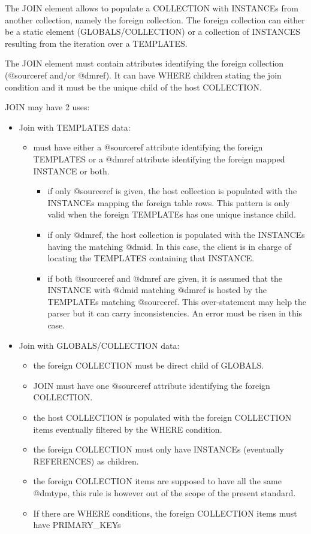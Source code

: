 The JOIN element allows to populate a COLLECTION with INSTANCEs from another collection, namely the foreign collection.
The foreign collection can either be a static element (GLOBALS/COLLECTION) or a collection of INSTANCES resulting from the iteration over a TEMPLATES.

The JOIN element must contain attributes identifying the foreign collection  (@sourceref  and/or @dmref). 
It can have WHERE children stating the join condition and it must be the unique child of the host COLLECTION.

JOIN may have 2 uses:

\begin{itemize}

    \item Join with TEMPLATES data:
       \begin{itemize}
         \item must have either a @sourceref attribute identifying the foreign TEMPLATES or a @dmref attribute identifying the foreign mapped INSTANCE or both.
             \begin{itemize}
               \item if only @sourceref is given, the host collection is populated with the INSTANCEs mapping the foreign table rows. 
                        This pattern is only valid when the foreign TEMPLATEs has  one unique instance child.
               \item if only @dmref, the host collection is populated with the INSTANCEs having the matching @dmid. In this case, 
                        the client is in charge of locating the TEMPLATES containing that INSTANCE.
               \item if both @sourceref and @dmref are given, it is assumed that the INSTANCE with @dmid matching @dmref is hosted by the TEMPLATEs matching @sourceref.
                        This over-statement may help the parser but it can carry inconsistencies. An error must be risen in this case.
             \end{itemize}
    \end{itemize}
  
   \item Join with GLOBALS/COLLECTION data:
       \begin{itemize}
         \item the foreign COLLECTION must be direct child of GLOBALS.
         \item JOIN must have one @sourceref attribute identifying the foreign COLLECTION.
         \item the host COLLECTION is populated with the foreign COLLECTION items eventually filtered by the WHERE condition.
         \item the foreign COLLECTION must only have INSTANCEs (eventually REFERENCES) as children.
         \item the foreign COLLECTION items are supposed to have all the same @dmtype, this rule is however out of the scope of the present standard.
         \item If there are WHERE conditions, the foreign COLLECTION items must have PRIMARY\_KEYs
  \end{itemize}
\end{itemize}

